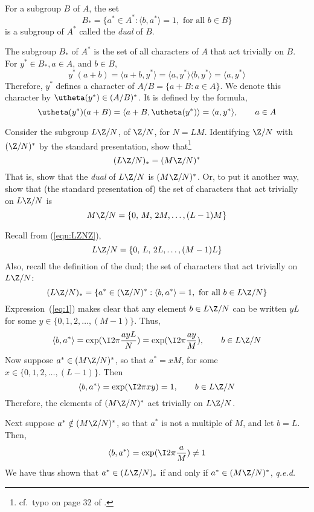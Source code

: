\begin{definition}[Dual]\\
For a subgroup $B$ of $A$, the set
\[
B_* = \{ a^* \in A^* : \langle b, a^* \rangle =1, \text{ for all } b \in B\}
\]
is a subgroup of $A^*$ called the \emph{dual} of $B$.  
\end{definition}
The subgroup $B_*$ of $A^*$ is the set of all characters of $A$ that act
trivially on $B$.  For $y^* \in B_*, a\in A$, and $b\in B$,
\[
y^*(a+b) = \langle a+b, y^* \rangle = 
\langle a, y^* \rangle  \langle b, y^* \rangle =
\langle a, y^* \rangle  
\]
Therefore, $y^*$ defines a character of $ A/B = \{a + B: a\in A\}$.
We denote this character by $\utheta(y^*)\in (A/B)^*$.  It is defined by the
formula,
\[
\utheta(y^*)(a+B) = \langle a+B, \utheta(y^*) \rangle = 
\langle a, y^* \rangle, \qquad a \in A
\]
\begin{exercise}
Consider the subgroup $L\Z/N$, of $\Z/N$, for $N = LM$.
Identifying $\Z/N$ with $(\Z/N)^*$ by the standard
presentation, show 
that\footnote{cf.~typo on page 32 of \cite{Tolimieri:1998}.} 
\[
(L\Z/N)_* = (M\Z/N)^*
\]
That is, show that the \emph{dual} of $L\Z/N$ is 
$(M\Z/N)^*$.
Or, to put it another way, show that (the standard presentation of) the set of
characters that act trivially on $L\Z/N$ is 
\[
M\Z/N = \{0,\,M,\,2M,\ldots,(L-1)M\}
\]
\end{exercise}
\begin{solution}
Recall from (\ref{eqn:LZNZ}),
\begin{equation}\label{eq:1}
L\Z/N  %
= \{0,\,L,\,2L,\ldots,(M-1)L\}%
\end{equation}
Also, recall the definition of the dual; \ie the set of characters that act
trivially on $L\Z/N$:
\[
(L\Z/N)_* = \{a^*\in (\Z/N)^* : \langle b, a^* \rangle =1, \text{ for all }
b \in L\Z/N \}
\]
Expression~(\ref{eq:1}) makes clear that any element $b\in L\Z/N$ can be
written $yL$ for some  
$y \in \{0, 1, 2, \ldots, (M-1)\}$.  Thus,
\[
\langle b, a^* \rangle = \exp(\I 2\pi\frac{ayL}{N})
= \exp(\I 2\pi\frac{ay}{M}), \qquad b \in L\Z/N
\]
Now suppose $a^* \in (M\Z/N)^*$, so that $a^* = xM$, for some 
$x \in \{0,1,2,\ldots,(L-1)\}$.  Then 
\[
\langle b, a^* \rangle = \exp(\I 2\pi xy) = 1, \qquad b \in L\Z/N
\]
Therefore, the elements of $(M\Z/N)^*$ act trivially on $L\Z/N$.  

Next suppose $a^* \notin (M\Z/N)^*$, so that $a^*$ is not a multiple of $M$, and let
$b = L$.  Then, 
\[
\langle b, a^* \rangle 
= \exp(\I 2\pi\frac{a}{M}) \neq 1
\]
We have thus shown that $a^* \in (L\Z/N)_*$ if and only if $a^* \in
(M\Z/N)^*$, {\it q.e.d.}
\end{solution}

